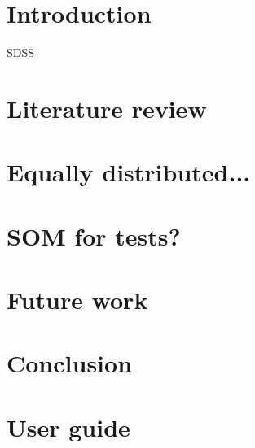 \documentclass[12pt]{book}
\begin{document}
\mainmatter

\chapter{Introduction}
%

\gls{SDSS}

\chapter{Literature review}


\chapter{Equally distributed...}

\chapter{SOM for tests?}

\chapter{Future work}


\chapter{Conclusion}


\appendix

\chapter{User guide}


\backmatter

\begin{refsection}
\nocite{Alvarez2019}

\printbibliography[heading=bibintoc,title={List of Publications}]
\end{refsection}
\end{document}
